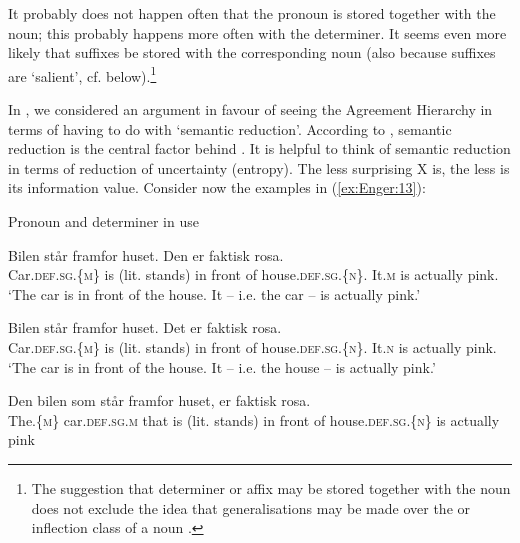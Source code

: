 \documentclass[output=paper]{langsci/langscibook}
\begin{document}
\begin{exe}
\begin{xlist}
\begin{xlist}
It probably does not happen often that the pronoun is stored together
with the noun; this probably happens more often with the determiner. It
seems even more likely that suffixes be stored with the corresponding
noun (also because suffixes are `salient', cf.  below).\footnote{The
  suggestion that determiner or affix may be stored together with the
  noun does not exclude the idea that generalisations may be made over
  the  or inflection class of a noun %
\citep[cf. e.g.][]{Conzett06}%
%
.}

In , we considered an argument in favour of seeing the Agreement
Hierarchy in terms of  having to do with `semantic
reduction'. According to %
\citet[583]{Heine2003}%
%
, semantic reduction is the
central factor behind . It is helpful to think of
semantic reduction in terms of reduction of uncertainty (entropy). The
less surprising X is, the less is its information value. Consider now
the examples in (\ref{ex:Enger:13}):

\ea\label{ex:Enger:13} Pronoun and determiner in use

\ea\label{ex:Enger:13a} \gll Bilen står framfor huset. Den er faktisk rosa.\\
Car.\textsc{def}.\textsc{sg}.\textsc{\{m\}} {is (lit. stands)} {in front of} house.\textsc{def}.\textsc{sg}.\textsc{\{n\}}. It.\textsc{m} is
actually pink.\\
\glt `The car is in front of the house. It -- i.e. the car -- is actually
pink.'

\ex\label{ex:Enger:13b} \gll Bilen står framfor huset. Det er faktisk rosa.\\
Car.\textsc{def}.\textsc{sg}.\textsc{\{m\}} {is (lit. stands)} {in front of} house.\textsc{def}.\textsc{sg}.\textsc{\{n\}}. It.\textsc{n} is
actually pink.\\
\glt `The car is in front of the house. It -- i.e. the house -- is actually
pink.'

\ex\label{ex:Enger:13c} \gll Den bilen som står framfor huset, er faktisk rosa.\\
The.\textsc{\{m\}} car.\textsc{def}.\textsc{sg}.\textsc{m} that {is (lit. stands)} {in front of} house.\textsc{def}.\textsc{sg}.\textsc{\{n\}} is
actually pink\\

\z
\z


\end{xlist}
\end{xlist}
\end{exe}
\end{document}
